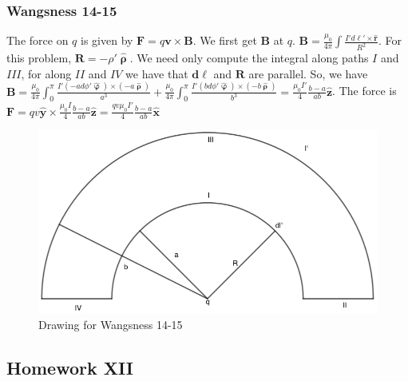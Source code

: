 \documentclass[crop=false,class=book,oneside]{standalone}
\begin{document}
            \subsubsection{Wangsness 14-15}
            The force on $q$ is given by $\mathbf{F} = q\mathbf{v}\times \mathbf{B}$. We first get $\mathbf{B}$ at $q$. $\mathbf{B} = \frac{\mu_0}{4\pi} \int \frac{I' d\ell' \times \hat{\mathbf{r}}}{R^2}$. For this problem, $\mathbf{R} = -\rho' \hat{\boldsymbol{\uprho}}$. We need only compute the integral along paths $I$ and $III$, for along $II$ and $IV$ we have that $\mathbf{d\ell}$ and $\mathbf{R}$ are parallel. So, we have $\mathbf{B} = \frac{\mu_0}{4\pi} \int_{0}^{\pi} \frac{I'(-ad\phi' \hat{\boldsymbol{\upvarphi}})\times (-a\hat{\boldsymbol{\uprho}})}{a^3}+ \frac{\mu_0}{4\pi} \int_{0}^{\pi} \frac{I'(bd\phi' \hat{\boldsymbol{\upvarphi}})\times (-b\hat{\boldsymbol{\uprho}})}{b^3} = \frac{\mu_0 I'}{4} \frac{b-a}{ab} \hat{\mathbf{z}}$. The force is $\mathbf{F} = qv\hat{\mathbf{y}} \times \frac{\mu_0 I}{4} \frac{b-a}{ab} \hat{\mathbf{z}} = \frac{qv\mu_0 I'}{4} \frac{b-a}{ab} \hat{\mathbf{x}}$
            \begin{figure}[htbp]
                \centering
                \captionsetup{type=figure}
                \includegraphics[scale=0.4]{14-15.png}
                \caption{Drawing for Wangsness 14-15}
            \end{figure}
        \subsection{Homework XII}
\end{document}
